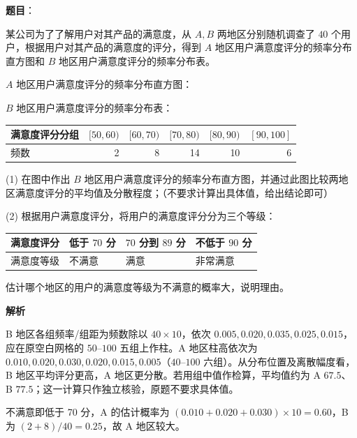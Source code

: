\begin{answer}

\textbf{题目}：

某公司为了了解用户对其产品的满意度，从 $A,B$ 两地区分别随机调查了 $40$ 个用户，根据用户对其产品的满意度的评分，得到 $A$ 地区用户满意度评分的频率分布直方图和 $B$ 地区用户满意度评分的频率分布表。

$A$ 地区用户满意度评分的频率分布直方图：
\nopagebreak[4]
\begin{center}\end{center}
\nopagebreak[4]
$B$ 地区用户满意度评分的频率分布表：

\begin{center}
\begin{tabular}{lrrrrr}
\toprule
满意度评分分组 & $[50,60)$ & $[60,70)$ & $[70,80)$ & $[80,90)$ & $[90,100]$ \\
\midrule
频数 & 2 & 8 & 14 & 10 & 6 \\
\bottomrule
\end{tabular}
\end{center}

(1) 在图中作出 $B$ 地区用户满意度评分的频率分布直方图，并通过此图比较两地区满意度评分的平均值及分散程度；（不要求计算出具体值，给出结论即可）
\nopagebreak[4]
\begin{center}\end{center}
\nopagebreak[4]
(2) 根据用户满意度评分，将用户的满意度评分分为三个等级：

\begin{center}
\begin{tabular}{llll}
\toprule
满意度评分 & 低于 $70$ 分 & $70$ 分到 $89$ 分 & 不低于 $90$ 分 \\
\midrule
满意度等级 & 不满意 & 满意 & 非常满意 \\
\bottomrule
\end{tabular}
\end{center}

估计哪个地区的用户的满意度等级为不满意的概率大，说明理由。

\textbf{解析}


B 地区各组频率/组距为频数除以 $40\times10$，依次 $0.005,0.020,0.035,0.025,0.015$，应在原空白网格的 $50$–$100$ 五组上作柱。A 地区柱高依次为 $0.010,0.020,0.030,0.020,0.015,0.005$（$40$–$100$ 六组）。从分布位置及离散幅度看，B 地区平均评分更高，A 地区更分散。若用组中值作检算，平均值约为 A $67.5$、B $77.5$；这一计算只作独立核验，原题不要求具体值。
\nopagebreak[4]
\begin{center}\end{center}
\nopagebreak[4]

不满意即低于 70 分，A 的估计概率为 $(0.010+0.020+0.030)\times10=0.60$，B 为 $(2+8)/40=0.25$，故 A 地区较大。



\end{answer}
